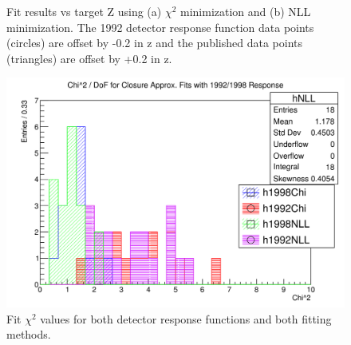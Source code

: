 \begin{figure}[h]
  \centering
  \hfill
  \caption{Fit results vs target Z using (a) $\chi^2$ minimization and (b) NLL minimization.
    The 1992 detector response function data points (circles) are offset by -0.2 in z and the published data points (triangles)
    are offset by +0.2 in z.
  }
\end{figure}

\begin{figure}[h]
  \centering
  \includegraphics[width=0.8\linewidth]{figures/png/chiSq_of_fits.png}
  \caption{Fit $\chi^2$ values for both detector response functions and both fitting methods. }
  \label{fig:ChiSqOfFits}
\end{figure}


